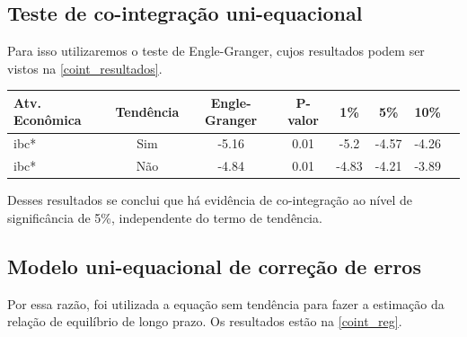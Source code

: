 \documentclass[a4paper,
               article,
               12pt,
               openany,
               oneside,
               english,
               brazil]{abntex2}
\numberwithin{equation}{section}
\begin{document}
    \subsection{Teste de co-integração uni-equacional}

    Para isso utilizaremos o teste de Engle-Granger, cujos resultados podem ser vistos na \autoref{coint_resultados}.

    \begin{table}[ht]
        {%
            \begin{tabular}{lccccccc}
                \midrule
                Atv. Econômica & Tendência & Engle-Granger & P-valor & 1\% & 5\% & 10\% \\
                \midrule
                ibc* & Sim & -5.16 & 0.01 & -5.2 & -4.57 & -4.26 \\
                ibc* & Não & -4.84 & 0.01 & -4.83 & -4.21 & -3.89 \\
                \midrule
            \end{tabular}
            } 
            {}
    \end{table}

    Desses resultados se conclui que há evidência de co-integração ao nível de significância de 5\%, independente do termo de tendência.
    
    \subsection{Modelo uni-equacional de correção de erros}

    Por essa razão, foi utilizada a equação sem tendência para fazer a estimação da relação de equilíbrio de longo prazo. Os resultados estão na \autoref{coint_reg}.
\end{document}
